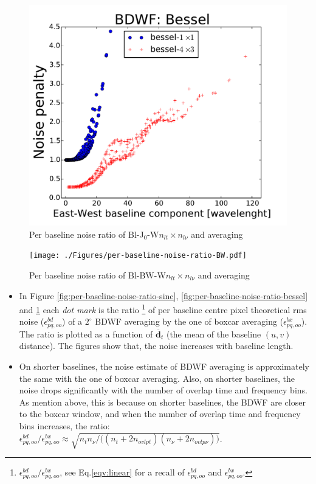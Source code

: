 \documentclass[useAMS,usenatbib]{mn2e}
\begin{document}
\begin{figure}
  \hspace{1cm}
  \begin{minipage}{0.38\linewidth}\includegraphics[width=1\textwidth]{./Figures/per-baseline-noise-ratio-bessel.pdf}\\
  \caption{Per baseline noise ratio of Bl-J$_0$-W$n_{lt}\times n_{l\nu}$ and 
averaging}\label{fig:per-baseline-noise-ratio-bessel}\end{minipage}
  \begin{minipage}{0.38\linewidth}\texttt{[image: ./Figures/per-baseline-noise-ratio-BW.pdf]}
  \caption{Per baseline noise ratio of Bl-BW-W$n_{lt}\times n_{l\nu}$ and averaging}\label{fig:per-baseline-noise-ratio-BW}
  \end{minipage}
\end{figure}
\begin{itemize}
 \item In Figure \ref{fig:per-baseline-noise-ratio-sinc}, \ref{fig:per-baseline-noise-ratio-bessel} 
and \ref{fig:per-baseline-noise-ratio-BW} each \textit{dot mark} is the ratio 
\footnote{$\epsilon^{bd}_{pq,oo}/\epsilon^{bx}_{pq,oo}$, see 
Eq.\ref{eqv:linear} for a recall of $\epsilon^{bd}_{pq,oo}$ and $\epsilon^{bx}_{pq,oo}$.} of per baseline centre pixel theoretical rms 
noise ($\epsilon^{bd}_{pq,oo}$) of a $2^\circ$ BDWF 
averaging  by the one of boxcar averaging ($\epsilon^{bx}_{pq,oo}$). The ratio is plotted as a function of 
$\overline{\mathbf{d}}_t$ (the mean of the baseline $(u,v)$ distance). The figures show that, the noise increases with baseline 
length.
   \item On shorter baselines, the noise estimate of BDWF averaging is approximately the same with the one 
of boxcar averaging. Also, on shorter baselines, the noise drops significantly with the number of  overlap time and frequency bins. As 
mention above, this is because on 
shorter  baselines, the BDWF are closer to the boxcar window, and when the number of overlap time  and 
frequency  bins increases, the ratio:
 $\epsilon^{bd}_{pq,oo}/\epsilon^{bx}_{pq,oo} \approx \sqrt{n_t n_{\nu}/\big((n_t + 2n_{ovlpt})(n_{\nu} + 
2n_{ovlp\nu})\big)}$.%
\end{itemize}
\end{document}
